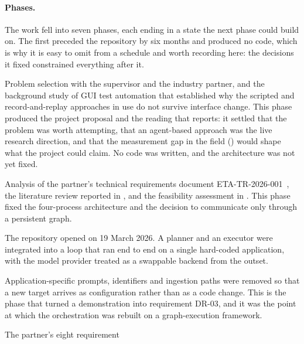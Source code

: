 \paragraph{Phases.} The work fell into seven phases, each ending in a state the
next phase could build on. The first preceded the repository by six months and
produced no code, which is why it is easy to omit from a schedule and worth
recording here: the decisions it fixed constrained everything after it.

\begin{description}[leftmargin=2.2em,style=nextline]
  \item[P0. Preliminary study (September--December 2025).] Problem selection
    with the supervisor and the industry partner, and the background study of
    GUI test automation that established why the scripted and record-and-replay
    approaches in use do not survive interface change. This phase produced the
    project proposal and the reading that  reports: it settled
    that the problem was worth attempting, that an agent-based approach was the
    live research direction, and that the measurement gap in the field
    () would shape what the project could claim. No
    code was written, and the architecture was not yet fixed.
  \item[P1. Requirements and feasibility (January--March 2026).] Analysis of the
    partner's technical requirements document ETA-TR-2026-001~\cite{etatr}, the
    literature review reported in , and the feasibility
    assessment in . This phase fixed the four-process
    architecture and the decision to communicate only through a persistent
    graph.
  \item[P2. Prototype (March--April 2026).] The repository opened on 19 March 2026.
    A planner and an executor were integrated into a loop that ran end to end
    on a single hard-coded application, with the model provider treated as a
    swappable backend from the outset.
  \item[P3. Generalisation (June--July 2026).] Application-specific prompts,
    identifiers and ingestion paths were removed so that a new target arrives
    as configuration rather than as a code change. This is the phase that
    turned a demonstration into requirement DR-03, and it was the point at
    which the orchestration was rebuilt on a graph-execution framework.
  \item[P4. Work packages WP0--WP9 (July 2026).] The partner's eight requirement

\end{description}
